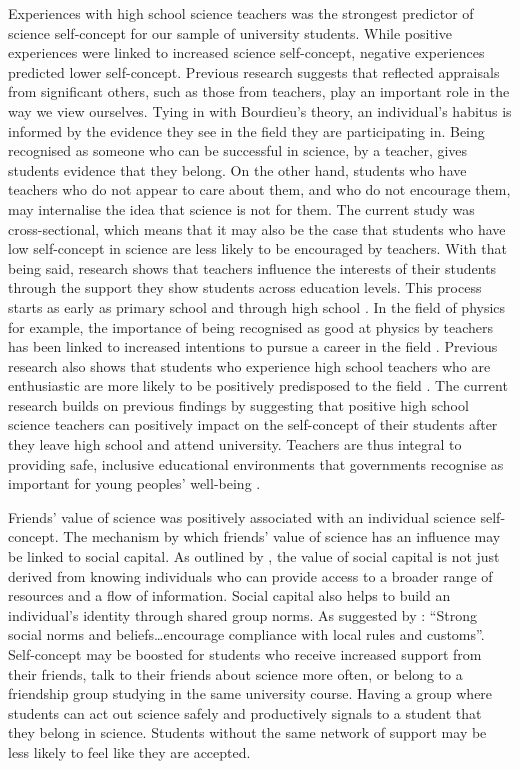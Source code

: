 Experiences with high school science teachers was the strongest predictor of science self-concept for our sample of university students. While positive experiences were linked to increased science self-concept, negative experiences predicted lower self-concept. Previous research suggests that reflected appraisals from significant others, such as those from teachers, play an important role in the way we view ourselves.\cite{bong2003academic} Tying in with Bourdieu's theory, an individual's habitus is informed by the evidence they see in the field they are participating in. Being recognised as someone who can be successful in science, by a teacher, gives students evidence that they belong. On the other hand, students who have teachers who do not appear to care about them, and who do not encourage them, may internalise the idea that science is not for them. The current study was cross-sectional, which means that it may also be the case that students who have low self-concept in science are less likely to be encouraged by teachers. With that being said, research shows that teachers influence the interests of their students through the support they show students across education levels\cite{marjoribanks2006adolescents}. This process starts as early as primary school \cite{fauth2014student} and through high school \cite{marjoribanks2006adolescents,Hazari2017}. In the field of physics for example, the importance of being recognised as good at physics by teachers has been linked to increased intentions to pursue a career in the field \cite{Hazari2017}. Previous research also shows that students who experience high school teachers who are enthusiastic are more likely to be positively predisposed to the field \cite{keller2017impact}. The current research builds on previous findings by suggesting that positive high school science teachers can positively impact on the self-concept of their students after they leave high school and attend university. Teachers are thus integral to providing safe, inclusive educational environments that governments recognise as important for young peoples' well-being \cite{wellbeing2019}. 

Friends' value of science was positively associated with an individual science self-concept. The mechanism by which friends' value of science has an influence may be linked to social capital. As outlined by \cite{lin1999building}, the value of social capital is not just derived from knowing individuals who can provide access to a broader range of resources and a flow of information. Social capital also helps to build an individual's identity through shared group norms. As suggested by \cite[p.29]{Adler2017}: ``Strong social norms and beliefs\ldots encourage compliance with local rules and customs''. Self-concept may be boosted for students who receive increased support from their friends, talk to their friends about science more often, or belong to a friendship group studying in the same university course. Having a group where students can act out science safely and productively signals to a student that they belong in science. Students without the same network of support may be less likely to feel like they are accepted. 

